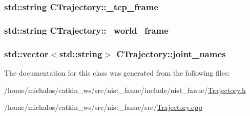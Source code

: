 \hypertarget{classCTrajectory_a53080e6e68f5ac166e9c7ca4fbe920c2}{
\subsubsection[{\-\_\-tcp\-\_\-frame}]{\setlength{\rightskip}{0pt plus 5cm}std\-::string C\-Trajectory\-::\-\_\-tcp\-\_\-frame}}\label{classCTrajectory_a53080e6e68f5ac166e9c7ca4fbe920c2}
\hypertarget{classCTrajectory_af1ee8c76ae0225ca65055ba87b338569}{
\subsubsection[{\-\_\-world\-\_\-frame}]{\setlength{\rightskip}{0pt plus 5cm}std\-::string C\-Trajectory\-::\-\_\-world\-\_\-frame}}\label{classCTrajectory_af1ee8c76ae0225ca65055ba87b338569}
\hypertarget{classCTrajectory_a8ccdbf828e5e09e82be6eb896aace3d7}{
\subsubsection[{joint\-\_\-names}]{\setlength{\rightskip}{0pt plus 5cm}std\-::vector$<$std\-::string$>$ C\-Trajectory\-::joint\-\_\-names}}\label{classCTrajectory_a8ccdbf828e5e09e82be6eb896aace3d7}


The documentation for this class was generated from the following files\-:\begin{DoxyCompactItemize}
\item 
/home/michalos/catkin\-\_\-ws/src/nist\-\_\-fanuc/include/nist\-\_\-fanuc/\hyperlink{Trajectory_8h}{Trajectory.\-h}\item 
/home/michalos/catkin\-\_\-ws/src/nist\-\_\-fanuc/src/\hyperlink{Trajectory_8cpp}{Trajectory.\-cpp}\end{DoxyCompactItemize}
